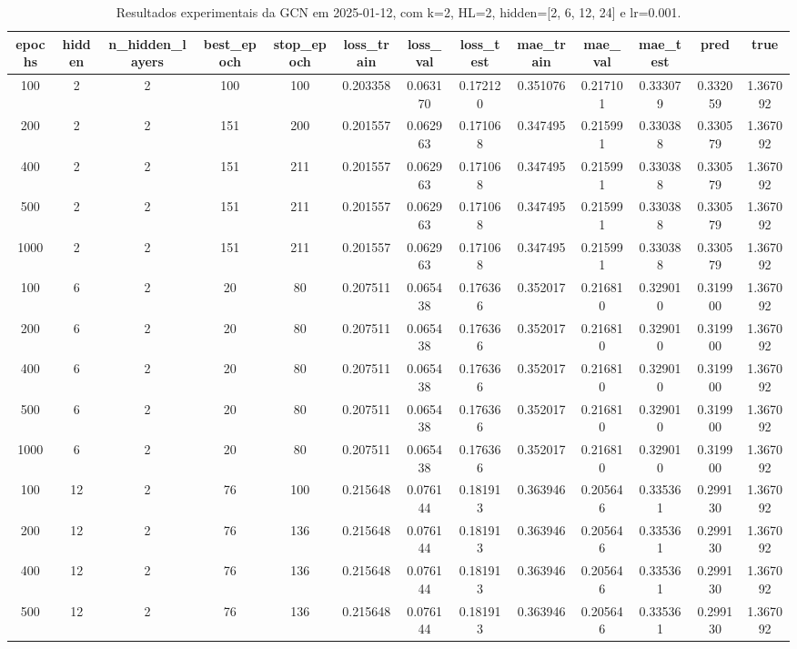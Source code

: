 \begin{table}[h]
\centering
\caption{Resultados experimentais da GCN em 2025-01-12, com k=2, HL=2, hidden=[2, 6, 12, 24] e lr=0.001.}
\label{tab:gcn_results_k2_hl2_d20250112}
\begin{tabular}{ccccccccccccc}
\toprule
epochs & hidden & n\_hidden\_layers & best\_epoch & stop\_epoch & loss\_train & loss\_val & loss\_test & mae\_train & mae\_val & mae\_test & pred & true \\
\midrule
100 & 2 & 2 & 100 & 100 & 0.203358 & 0.063170 & 0.172120 & 0.351076 & 0.217101 & 0.333079 & 0.332059 & 1.367092 \\
200 & 2 & 2 & 151 & 200 & 0.201557 & 0.062963 & 0.171068 & 0.347495 & 0.215991 & 0.330388 & 0.330579 & 1.367092 \\
400 & 2 & 2 & 151 & 211 & 0.201557 & 0.062963 & 0.171068 & 0.347495 & 0.215991 & 0.330388 & 0.330579 & 1.367092 \\
500 & 2 & 2 & 151 & 211 & 0.201557 & 0.062963 & 0.171068 & 0.347495 & 0.215991 & 0.330388 & 0.330579 & 1.367092 \\
1000 & 2 & 2 & 151 & 211 & 0.201557 & 0.062963 & 0.171068 & 0.347495 & 0.215991 & 0.330388 & 0.330579 & 1.367092 \\
100 & 6 & 2 & 20 & 80 & 0.207511 & 0.065438 & 0.176366 & 0.352017 & 0.216810 & 0.329010 & 0.319900 & 1.367092 \\
200 & 6 & 2 & 20 & 80 & 0.207511 & 0.065438 & 0.176366 & 0.352017 & 0.216810 & 0.329010 & 0.319900 & 1.367092 \\
400 & 6 & 2 & 20 & 80 & 0.207511 & 0.065438 & 0.176366 & 0.352017 & 0.216810 & 0.329010 & 0.319900 & 1.367092 \\
500 & 6 & 2 & 20 & 80 & 0.207511 & 0.065438 & 0.176366 & 0.352017 & 0.216810 & 0.329010 & 0.319900 & 1.367092 \\
1000 & 6 & 2 & 20 & 80 & 0.207511 & 0.065438 & 0.176366 & 0.352017 & 0.216810 & 0.329010 & 0.319900 & 1.367092 \\
100 & 12 & 2 & 76 & 100 & 0.215648 & 0.076144 & 0.181913 & 0.363946 & 0.205646 & 0.335361 & 0.299130 & 1.367092 \\
200 & 12 & 2 & 76 & 136 & 0.215648 & 0.076144 & 0.181913 & 0.363946 & 0.205646 & 0.335361 & 0.299130 & 1.367092 \\
400 & 12 & 2 & 76 & 136 & 0.215648 & 0.076144 & 0.181913 & 0.363946 & 0.205646 & 0.335361 & 0.299130 & 1.367092 \\
500 & 12 & 2 & 76 & 136 & 0.215648 & 0.076144 & 0.181913 & 0.363946 & 0.205646 & 0.335361 & 0.299130 & 1.367092 \\

\end{tabular}
\end{table}
